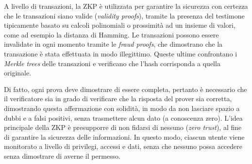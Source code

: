 A livello di transazioni, la ZKP è utilizzata per garantire la sicurezza con certezza che le transazioni siano valide (\textit{validity proofs}), tramite la presenza del testimone tipicamente basato su calcoli polinomiali o
prossimità ad un insieme di valori, come ad esempio la distanza di Hamming. Le transazioni possono essere invalidate in ogni momento tramite le \textit{fraud proofs}, che dimostrano che la transazione è stata effettuata in modo illegittimo.
Queste ultime confrontano i \textit{Merkle trees} delle transazioni e verificano che l'hash corrisponda a quella originale. \\

\newpage 

Di fatto, ogni prova deve dimostrare di essere completa, pertanto è necessario che il verificatore sia in grado di verificare che la risposta del prover sia corretta,
dimostrando questa affermazione con solidità, in modo da non lasciare spazio a dubbi e a falsi positivi, senza trasmettere alcun dato (a conoscenza zero).
L'idea principale della ZKP è presupporre di non fidarsi di nessuno (\textit{zero trust}), al fine di garantire la sicurezza delle informazioni. 
In questo modo, ciascun utente viene monitorato a livello di privilegi, accessi e dati, senza che nessuno possa accedere senza dimostrare di averne il permesso. \\

